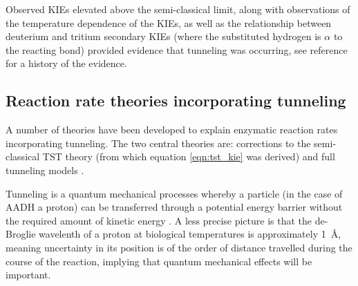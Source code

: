 Observed KIEs elevated above the semi-classical limit, along with observations of the temperature dependence of the KIEs, as well as the relationship between deuterium and tritium secondary KIEs (where the substituted hydrogen is $\alpha$ to the reacting bond) provided evidence that tunneling was occurring, see reference \cite{klinmanbeyond2009} for a history of the evidence. 

\subsection{Reaction rate theories incorporating tunneling}

A number of theories have been developed to explain enzymatic reaction rates incorporating tunneling. The two central theories are: corrections to the semi-classical TST theory (from which equation \ref{eqn:tst_kie} was derived) \cite{bellTunnelEffectChemistry1980} and full tunneling models \cite{kuznetsovProtonHydrogenAtom1999a,  antoniouLargeKineticIsotope1997, antoniouInternalEnzymeMotions2001, knappTemperatureDependentIsotopeEffects2002}. 

Tunneling is a quantum mechanical processes whereby a particle (in the case of AADH a proton) can be transferred through a potential energy barrier without the required amount of kinetic energy \cite[chapter 3, 5]{allemannQuantumTunnellingEnzymeCatalysed2004}. A less precise picture \cite{chaHydrogenTunnelingEnzyme1989} is that the de-Broglie wavelenth of a proton at biological temperatures is approximately \SI{1}{\angstrom}, meaning uncertainty in its position is of the order of distance travelled during the course of the reaction, implying that quantum mechanical effects will be important.  

